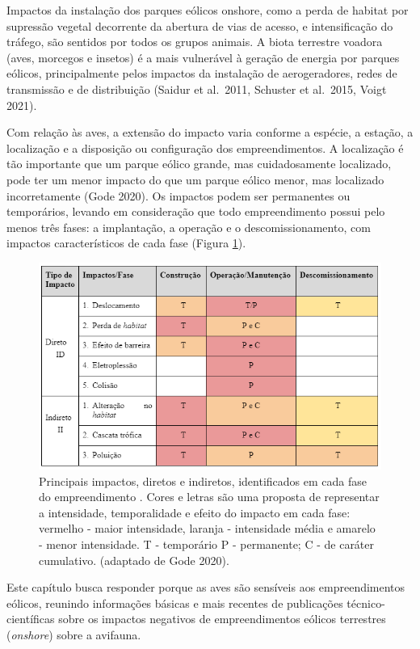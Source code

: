 \documentclass[
  oneside]{scrbook}
\begin{document}
Impactos da instalação dos parques eólicos onshore, como a perda de habitat por supressão vegetal decorrente da abertura de vias de acesso, e intensificação do tráfego, são sentidos por todos os grupos animais. A biota terrestre voadora (aves, morcegos e insetos) é a mais vulnerável à geração de energia por parques eólicos, principalmente pelos impactos da instalação de aerogeradores, redes de transmissão e de distribuição (Saidur et al.~2011, Schuster et al.~2015, Voigt 2021).

Com relação às aves, a extensão do impacto varia conforme a espécie, a estação, a localização e a disposição ou configuração dos empreendimentos. A localização é tão importante que um parque eólico grande, mas cuidadosamente localizado, pode ter um menor impacto do que um parque eólico menor, mas localizado incorretamente (Gode 2020). Os impactos podem ser permanentes ou temporários, levando em consideração que todo empreendimento possui pelo menos três fases: a implantação, a operação e o descomissionamento, com impactos característicos de cada fase (Figura \ref{fig:12}).

\begin{figure}[H]

{\centering \includegraphics[width=0.75\linewidth]{imagens/cap04/Figura_4.1} 

}

\caption{Principais impactos, diretos e indiretos, identificados em cada fase do empreendimento . Cores e letras são uma proposta de representar a intensidade, temporalidade e efeito do impacto em cada fase: vermelho - maior intensidade, laranja - intensidade média e amarelo - menor intensidade. T - temporário P  -  permanente; C - de caráter cumulativo. (adaptado de Gode 2020).}\label{fig:12}
\end{figure}

Este capítulo busca responder porque as aves são sensíveis aos empreendimentos eólicos, reunindo informações básicas e mais recentes de publicações técnico-científicas sobre os impactos negativos de empreendimentos eólicos terrestres (\emph{onshore}) sobre a avifauna.
\end{document}
